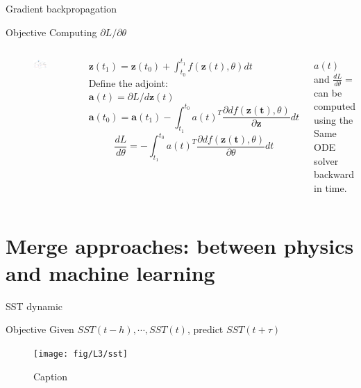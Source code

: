 \documentclass[handout]{beamer}
\newcommand{\rref}[1][]{\hfill{\scriptsize\textit{#1}}}
\begin{document}
\begin{frame}{Gradient backpropagation}
\begin{block}{Objective}
Computing $\partial L/ \partial \theta$
\end{block}
 \begin{columns}
   
        \begin{figure}
        \centering
        \includegraphics[width=\textwidth]{fig/L3/ODEscheme.png}
    \end{figure}
    $\mathbf{z}(t_1) = \mathbf{z}(t_0)  + \int_{t_0}^{t_1} f(\mathbf{z}(t),\theta) dt$\\
    Define the adjoint:\\
    $\mathbf{a}(t)=\partial L / d\mathbf{z}(t)$\\
    $$\mathbf{a}(t_0)=\mathbf{a}(t_1) -\int_{t_1}^{t_0} a(t)^T \frac{\partial d f(\mathbf{z(t)},\theta)}{\partial \mathbf{z}}dt$$
      $$\frac{d L}{d\theta}=-\int_{t_1}^{t_0} a(t)^T \frac{\partial d f(\mathbf{z(t)},\theta)}{\partial \theta}dt$$
    
    $a(t)$ and $\frac{d L}{d\theta}=$ can be computed using the Same ODE solver backward in time.
    \end{columns}
\end{frame}

\section{Merge approaches: between physics and machine learning}
\begin{frame}{SST dynamic}
    \rref[\cite{DeBezenac2017TowardsModeling}]
    \begin{block}{Objective}
    Given $SST(t-h),\cdots,SST(t)$, predict $SST(t+\tau)$
    \end{block}
    \begin{figure}
        \centering
        \texttt{[image: fig/L3/sst]}
        \caption{Caption}
        \label{fig:my_label}
    \end{figure}
\end{frame}
\end{document}
